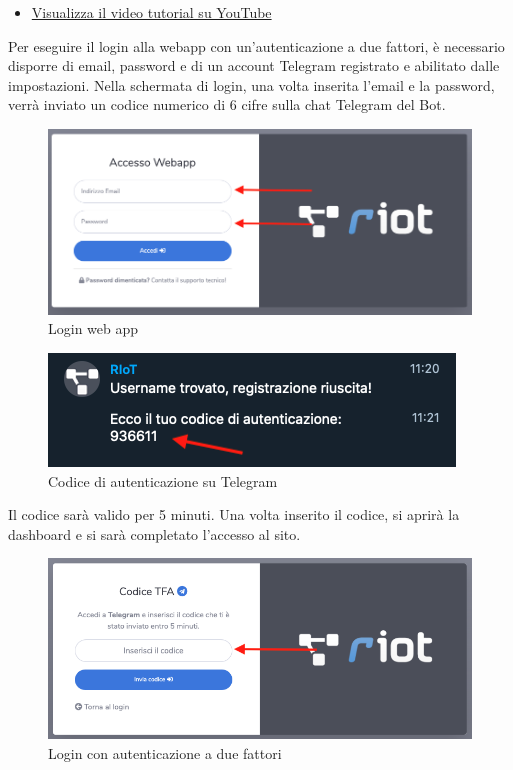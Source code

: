 	\begin{itemize}
		\item \href{https://www.youtube.com/watch?v=PjySMOLCtMA&list=PLPKYjnuIh1FA3b3jn_bwY_ztYzaFn2mIT&index=2}{Visualizza il video tutorial su YouTube} 
	\end{itemize}
	Per eseguire il login alla webapp con un’autenticazione a due fattori, è necessario disporre di email, password e di un account Telegram registrato e abilitato dalle impostazioni.
	Nella schermata di login, una volta inserita l'email e la password, verrà inviato un codice numerico di 6 cifre sulla chat Telegram del Bot. 
	\begin{figure}[H]
		\centering
		\includegraphics[scale=0.450]{res/images/membro/login.png}
		\caption{Login web app}
	\end{figure}
	\begin{figure}[H]
		\centering
		\includegraphics[scale=0.600]{res/images/membro/tokenTFA.png}
		\caption{Codice di autenticazione su Telegram}
	\end{figure}

	Il codice sarà valido per 5 minuti. Una volta inserito il codice, si aprirà la dashboard e si sarà completato l'accesso al sito.
	\begin{figure}[H]
		\centering
		\includegraphics[scale=0.600]{res/images/membro/loginTFA.png}
		\caption{Login con autenticazione a due fattori}
	\end{figure}




